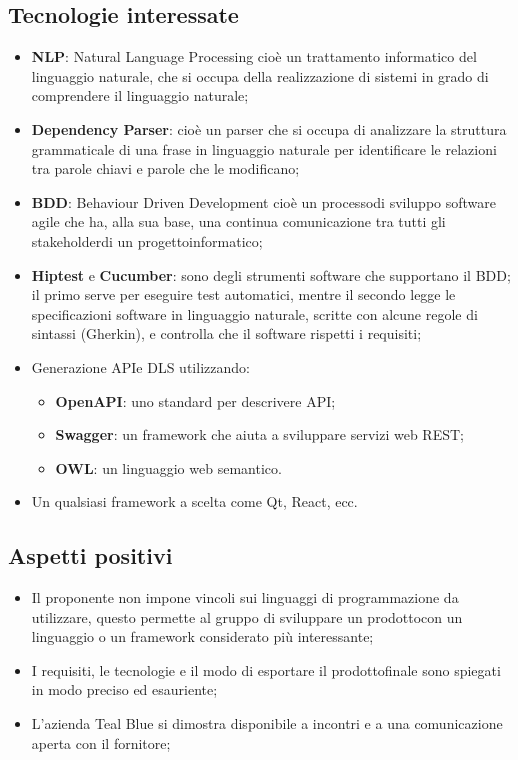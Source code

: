 \subsection{Tecnologie interessate}
\begin{itemize}
	\item \textbf{NLP}: Natural Language Processing cioè un trattamento informatico del linguaggio naturale, che si occupa della realizzazione di sistemi in grado di comprendere il linguaggio naturale;	
	\item \textbf{Dependency Parser}: cioè un parser che si occupa di analizzare la struttura grammaticale di una frase in linguaggio naturale per identificare le relazioni tra parole chiavi e parole che le modificano;
	\item \textbf{BDD}: Behaviour Driven Development cioè un processo\glosp di sviluppo software agile che ha, alla sua base, una continua comunicazione tra tutti gli stakeholder\glosp di un progetto\glosp informatico;
	\item \textbf{Hiptest} e \textbf{Cucumber}: sono degli strumenti software che supportano il BDD; il primo serve per eseguire test automatici, mentre il secondo legge le specificazioni software in linguaggio naturale, scritte con alcune regole di sintassi (Gherkin), e controlla che il software rispetti i requisiti;
	\item Generazione API\glosp e DLS utilizzando:
	\begin{itemize}
		\item \textbf{OpenAPI}: uno standard per descrivere API\glo;
		\item \textbf{Swagger}: un framework che aiuta a sviluppare servizi web REST\glo;
		\item \textbf{OWL}: un linguaggio web semantico.
	\end{itemize}
	\item Un qualsiasi framework a scelta come Qt, React, ecc.
\end{itemize} 
\subsection{Aspetti positivi}
\begin{itemize} 
	\item Il proponente non impone vincoli sui linguaggi di programmazione da utilizzare, questo permette al gruppo di sviluppare un prodotto\glosp con un linguaggio o un framework considerato più interessante;
	\item I requisiti, le tecnologie e il modo di esportare il prodotto\glosp finale sono spiegati in modo preciso ed esauriente;
	\item L'azienda Teal Blue si dimostra disponibile a incontri e a una comunicazione aperta con il fornitore;
\end{itemize}

